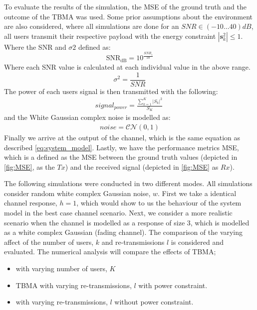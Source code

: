 \documentclass{article}
\begin{document}
To evaluate the results of the simulation, the \ac{MSE} of the ground truth and the outcome of the TBMA was used. Some prior assumptions about the environment are also considered, where all simulations are done for an $SNR \in (-10\dots40)dB$, all users transmit their respective payload with the energy constraint  $|\textbf{s}_{k}^2| \leq 1$.  
Where the SNR and $\sigma2$ defined as:
\begin{equation} 
\text{SNR}_{\text{dB}} = 10^{\frac{SNR_{i}}{10}}    
\end{equation}
Where each SNR value is calculated at each individual value in the above range.
\begin{equation}
    \sigma^2 = \frac{1}{SNR}
\end{equation}
The power of each users signal is then transmitted with the following:
\begin{align}
    signal_{power} = \frac{\sum\limits_{k=1}^{K}|S_{k}|^2 }{S_{K}} \     
\end{align}
and the White Gaussian complex noise is modelled as:
\begin{align}
    noise = \mathcal{CN}(0,1)
\end{align}
Finally we arrive at the output of the channel, which is the same equation as described \cref{eq:system_model}. Lastly, we have the performance metrics MSE, which is a defined as the MSE between the ground truth values (depicted in \ref{fig:MSE}, as the $Tx$) and the received signal (depicted in \ref{fig:MSE} as $Rx$).


The following simulations were conducted in two different modes. All simulations consider random white complex Gaussian noise, $w$. First we take a identical channel response, $h=1$, which would show to us the behaviour of the system model in the best case channel scenario. Next, we consider a more realistic scenario when the channel is modelled as a response of size 3, which is modelled as a white complex Gaussian (fading channel). The comparison of the varying affect of the number of users, $k$ and re-transmissions $l$ is considered and evaluated. 
The numerical analysis will compare the effects of TBMA;
\begin{itemize}
    \item  with varying number of users, $K$
    \item TBMA with varying re-transmissions, $l$ with power constraint.    
    \item  with varying re-transmissions, $l$ without power constraint.
\end{itemize}
\end{document}
